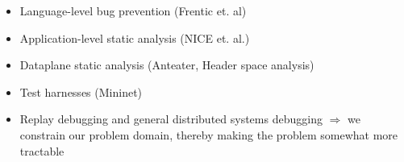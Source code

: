 \begin{itemize}

\item Language-level bug prevention (Frentic et. al)
\item Application-level static analysis (NICE et. al.)
\item Dataplane static analysis (Anteater, Header space analysis)
\item Test harnesses (Mininet)
\item Replay debugging and general distributed systems debugging $\Rightarrow$ we constrain our problem domain, thereby making the problem somewhat more tractable

\end{itemize}

